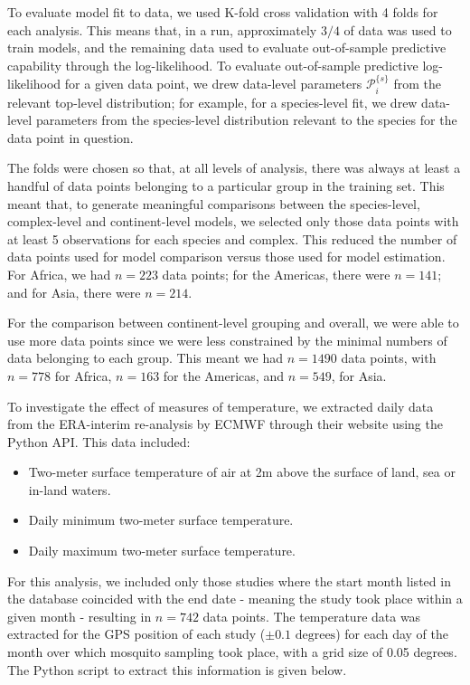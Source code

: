 \documentclass[12pt]{article}
\begin{document}
{To evaluate model fit to data, we used K-fold cross validation with 4 folds for each analysis. This means that, in a run, approximately $3/4$ of data was used to train models, and the remaining data used to evaluate out-of-sample predictive capability through the log-likelihood. To evaluate out-of-sample predictive log-likelihood for a given data point, we drew data-level parameters $\mathcal{P}_i^{\{s\}}$ from the relevant top-level distribution; for example, for a species-level fit, we drew data-level parameters from the species-level distribution relevant to the species for the data point in question. 

The folds were chosen so that, at all levels of analysis, there was always at least a handful of data points belonging to a particular group in the training set. This meant that, to generate meaningful comparisons between the species-level, complex-level and continent-level models, we selected only those data points with at least 5 observations for each species and complex. This reduced the number of data points used for model comparison versus those used for model estimation. For Africa, we had $n=223$ data points; for the Americas, there were $n=141$; and for Asia, there were $n=214$.

For the comparison between continent-level grouping and overall, we were able to use more data points since we were less constrained by the minimal numbers of data belonging to each group. This meant we had $n=1490$ data points, with $n=778$ for Africa, $n=163$ for the Americas, and $n=549$, for Asia.

To investigate the effect of measures of temperature, we extracted daily data from the ERA-interim re-analysis by ECMWF \citep{dee2011era} through their website using the Python API. This data included: 

\begin{itemize}
	\item Two-meter surface temperature of air at 2m above the surface of land, sea or in-land waters.
	\item Daily minimum two-meter surface temperature.
	\item Daily maximum two-meter surface temperature.
\end{itemize}

For this analysis, we included only those studies where the start month listed in the database coincided with the end date - meaning the study took place within a given month - resulting in $n=742$ data points. The temperature data was extracted for the GPS position of each study ($\pm 0.1 \text{ degrees}$) for each day of the month over which mosquito sampling took place, with a grid size of 0.05 degrees. The Python script to extract this information is given below.

}
\end{document}
